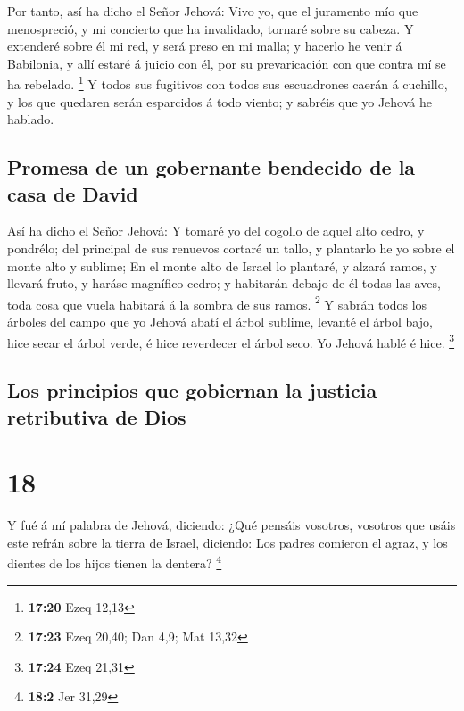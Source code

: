  Por tanto, así ha dicho el Señor Jehová: Vivo yo, que el
juramento mío que menospreció, y mi concierto que ha invalidado, tornaré
sobre su cabeza.  Y extenderé sobre él mi red, y será
preso en mi malla; y hacerlo he venir á Babilonia, y allí estaré á
juicio con él, por su prevaricación con que contra mí se ha rebelado.
\footnote{\textbf{17:20} Ezeq 12,13}  Y todos sus
fugitivos con todos sus escuadrones caerán á cuchillo, y los que
quedaren serán esparcidos á todo viento; y sabréis que yo Jehová he
hablado.

\hypertarget{promesa-de-un-gobernante-bendecido-de-la-casa-de-david}{%
\subsection{Promesa de un gobernante bendecido de la casa de
David}\label{promesa-de-un-gobernante-bendecido-de-la-casa-de-david}}

 Así ha dicho el Señor Jehová: Y tomaré yo del cogollo de
aquel alto cedro, y pondrélo; del principal de sus renuevos cortaré un
tallo, y plantarlo he yo sobre el monte alto y sublime; 
En el monte alto de Israel lo plantaré, y alzará ramos, y llevará fruto,
y haráse magnífico cedro; y habitarán debajo de él todas las aves, toda
cosa que vuela habitará á la sombra de sus ramos. \footnote{\textbf{17:23}
  Ezeq 20,40; Dan 4,9; Mat 13,32}  Y sabrán todos los
árboles del campo que yo Jehová abatí el árbol sublime, levanté el árbol
bajo, hice secar el árbol verde, é hice reverdecer el árbol seco. Yo
Jehová hablé é hice. \footnote{\textbf{17:24} Ezeq 21,31}

\hypertarget{los-principios-que-gobiernan-la-justicia-retributiva-de-dios}{%
\subsection{Los principios que gobiernan la justicia retributiva de
Dios}\label{los-principios-que-gobiernan-la-justicia-retributiva-de-dios}}

\hypertarget{section-17}{%
\section{18}\label{section-17}}

 Y fué á mí palabra de Jehová, diciendo: 
¿Qué pensáis vosotros, vosotros que usáis este refrán sobre la tierra de
Israel, diciendo: Los padres comieron el agraz, y los dientes de los
hijos tienen la dentera? \footnote{\textbf{18:2} Jer 31,29}

